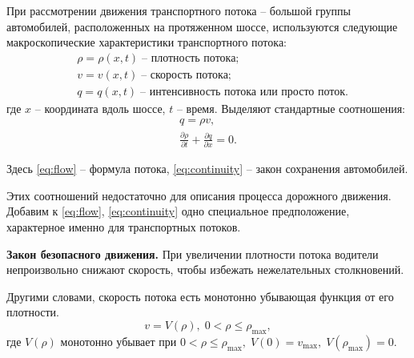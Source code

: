 \documentclass[12pt,a4paper]{article}
\begin{document}
При рассмотрении движения транспортного потока -- большой группы автомобилей, расположенных на протяженном шоссе, используются следующие макроскопические характеристики транспортного потока:
\begin{align*}
&\rho = \rho(x,t)\;\text{-- плотность потока;} \\
&v = v(x,t)\;\text{-- скорость потока;} \\
&q = q(x,t)
\;\text{-- интенсивность потока или просто поток.}
\end{align*}
где $x$ -- координата вдоль шоссе, $t$ -- время. Выделяют стандартные соотношения:
\begin{gather}
q = \rho v, \label{eq:flow} \\
\frac{\partial \rho}{\partial t} + \frac{\partial q}{\partial x} = 0. \label{eq:continuity}
\end{gather}

Здесь \eqref{eq:flow} -- формула потока, \eqref{eq:continuity} -- закон сохранения автомобилей.

Этих соотношений недостаточно для описания процесса дорожного движения.
Добавим к \eqref{eq:flow}, \eqref{eq:continuity} одно специальное предположение, характерное именно для транспортных потоков.
\begin{tcolorbox}[
    colback=white,
    colframe=black,
    boxrule=0.8pt,
    arc=0pt,
    left=2mm,
    right=2mm,
    top=1mm,
    bottom=1mm
]
\textbf{Закон безопасного движения.}
При увеличении плотности потока водители непроизвольно снижают скорость,
чтобы избежать нежелательных столкновений. 
\end{tcolorbox}
Другими словами, скорость потока
есть монотонно убывающая функция от его плотности.
\begin{equation}
v = V(\rho), \; 0 < \rho \leq \rho_{\max},
\label{eq:speed_density_general}
\end{equation}
где $V(\rho)$ монотонно убывает при $0 < \rho \leq \rho_{\max},\; V(0) = v_{\max}, \; V(\rho_{\max}) = 0.$
\end{document}
